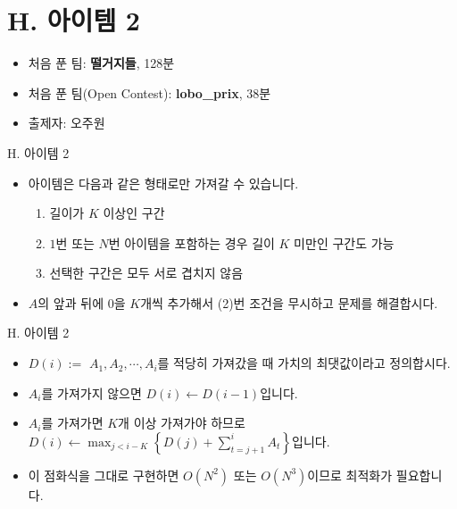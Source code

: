 \def\probno{H}
\def\probtitle{아이템 2}

\section{\probno{}. \probtitle{}}

\begin{frame} %
    \sectiontitle{\probno{}}{\probtitle{}}
    \begin{itemize}
        \item 처음 푼 팀: \textbf{떨거지들}, 128분
        \item 처음 푼 팀(Open Contest): \textbf{lobo\_prix}, 38분
        \item 출제자: 오주원
    \end{itemize}
\end{frame}

\begin{frame}{\probno{}. \probtitle{}}
    \begin{itemize}
        \item 아이템은 다음과 같은 형태로만 가져갈 수 있습니다.
        \begin{enumerate}
            \item 길이가 $K$ 이상인 구간
            \item $1$번 또는 $N$번 아이템을 포함하는 경우 길이 $K$ 미만인 구간도 가능
            \item 선택한 구간은 모두 서로 겹치지 않음
        \end{enumerate}
        \item $A$의 앞과 뒤에 $0$을 $K$개씩 추가해서 (2)번 조건을 무시하고 문제를 해결합시다.
    \end{itemize}
\end{frame}

\begin{frame}{\probno{}. \probtitle{}}
    \begin{itemize}
        \item $D(i) := $ $A_1, A_2, \cdots, A_i$를 적당히 가져갔을 때 가치의 최댓값이라고 정의합시다.
        \item $A_i$를 가져가지 않으면 $D(i) \leftarrow D(i-1)$입니다.
        \item $A_i$를 가져가면 $K$개 이상 가져가야 하므로 $D(i) \leftarrow \max_{j<i-K} \left\{D(j) + \textstyle\sum_{t=j+1}^{i} A_t\right\}$입니다.
        \item 이 점화식을 그대로 구현하면 $O(N^2)$ 또는 $O(N^3)$이므로 최적화가 필요합니다.
    \end{itemize}
\end{frame}

